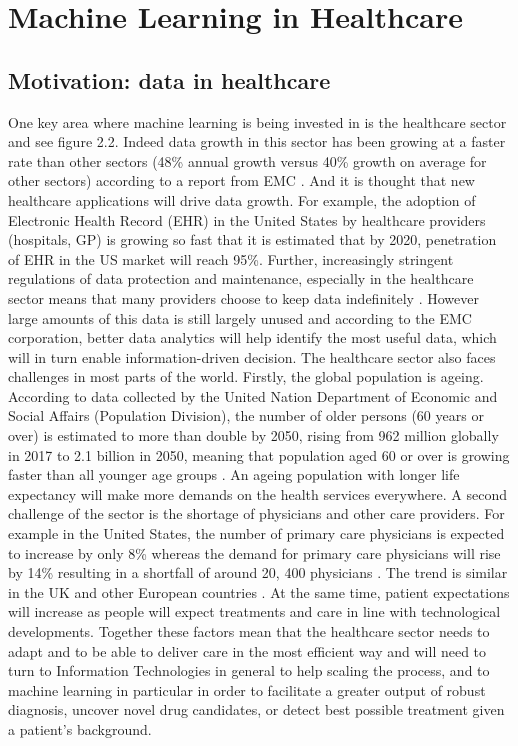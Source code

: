 \section{Machine Learning in Healthcare}
\subsection{Motivation: data in healthcare}
One key area where machine learning is being invested in is the healthcare sector \citep{Obermeyer:2016ju,EMC:2014ve, Evans:sHGdqFvY} and see figure 2.2. Indeed data growth in this sector has been growing at a faster rate than other sectors (48\% annual growth versus 40\% growth on average for other sectors) according to a report from EMC \citep{EMC:2014ve}. And it is thought that new healthcare applications will drive data growth. For example, the adoption of Electronic Health Record (EHR) in the United States by healthcare providers (hospitals, GP) is growing so fast that it is estimated that by 2020, penetration of EHR in the US market will reach 95\%. Further, increasingly stringent regulations of data protection and maintenance, especially in the healthcare sector means that many providers choose to keep data indefinitely \citep{EMC:2014ve}.  However large amounts of this data is still largely unused and according to the EMC corporation, better data analytics will help identify the most useful data, which will in turn enable information-driven decision.
The healthcare sector also faces challenges in most parts of the world. Firstly, the global population is ageing. According to data collected by the United Nation Department of Economic and Social Affairs (Population Division), the number of older persons (60 years or over) is estimated to more than double by 2050, rising from 962 million globally in 2017 to 2.1 billion in 2050, meaning that population aged 60 or over is growing faster than all younger age groups \citep{UnitedNations:2017wd}. An ageing population with longer life expectancy will make more demands on the health services everywhere. A second challenge of the sector is the shortage of physicians and other care providers. For example in the United States, the number of primary care physicians is expected to increase by only 8\% whereas the demand for primary care physicians will rise by 14\% resulting in a shortfall of around 20, 400 physicians \citep{EMC:2014ve}. The trend is similar in the UK and other European countries \citep{Campbell:ti}. At the same time, patient expectations will increase as people will expect treatments and care in line with technological developments.\newline
Together these factors  mean that the healthcare sector needs to adapt and to be able to deliver care in the most efficient way and will need to turn to Information Technologies in general to help scaling the process, and to machine learning in particular in order to facilitate a greater output of robust diagnosis, uncover novel drug candidates, or detect best possible treatment given a patient's background.\newline

